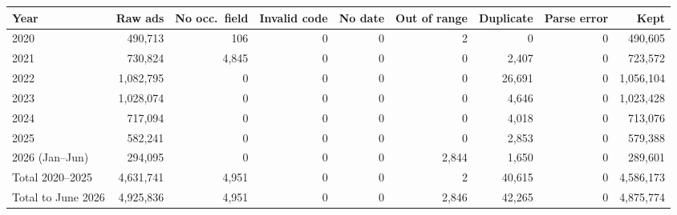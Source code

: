 \scriptsize
\setlength{\tabcolsep}{3pt}
\begin{tabular}{lrrrrrrrr}
\hline\hline
Year & Raw ads & No occ.\ field & Invalid code & No date & Out of range & Duplicate & Parse error & Kept \\
\hline
2020 & 490,713 & 106 & 0 & 0 & 2 & 0 & 0 & 490,605 \\
2021 & 730,824 & 4,845 & 0 & 0 & 0 & 2,407 & 0 & 723,572 \\
2022 & 1,082,795 & 0 & 0 & 0 & 0 & 26,691 & 0 & 1,056,104 \\
2023 & 1,028,074 & 0 & 0 & 0 & 0 & 4,646 & 0 & 1,023,428 \\
2024 & 717,094 & 0 & 0 & 0 & 0 & 4,018 & 0 & 713,076 \\
2025 & 582,241 & 0 & 0 & 0 & 0 & 2,853 & 0 & 579,388 \\
\hline
2026 (Jan--Jun) & 294,095 & 0 & 0 & 0 & 2,844 & 1,650 & 0 & 289,601 \\
\hline
Total 2020--2025 & 4,631,741 & 4,951 & 0 & 0 & 2 & 40,615 & 0 & 4,586,173 \\
Total to June 2026 & 4,925,836 & 4,951 & 0 & 0 & 2,846 & 42,265 & 0 & 4,875,774 \\
\hline\hline
\end{tabular}